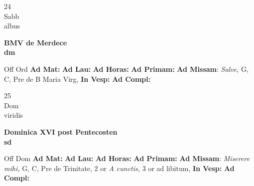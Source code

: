 \documentclass[10pt, openany]{book}
\begin{document}
    \begin{center}
        \begin{minipage}{3.5in}
            \vspace{2em}
            \begin{minipage}{0.5in}
                {\Huge 24} \\
                {\normalsize Sabb} \\
                {\normalsize albus}
            \end{minipage}
            \begin{minipage}{3.0in}
                \textbf{ \large BMV de Merdece \\
                \textnormal{\normalsize dm}} \\ 
            \end{minipage}
            \begin{justify}Off Ord
                \textbf{Ad Mat: }
                \textbf{Ad Lau: }
                \textbf{Ad Horas: }
                \textbf{Ad Primam: }\textbf{Ad Missam}: \textit{Salve,} G, C, Pre de B Maria Virg,  
                \textbf{In Vesp: }
                \textbf{Ad Compl: }
            \end{justify}
        \end{minipage}
    \end{center}

    \begin{center}
        \begin{minipage}{3.5in}
            \vspace{2em}
            \begin{minipage}{0.5in}
                {\Huge 25} \\
                {\normalsize Dom} \\
                {\normalsize viridis}
            \end{minipage}
            \begin{minipage}{3.0in}
                \textbf{ \large Dominica XVI post Pentecosten \\
                \textnormal{\normalsize sd}} \\ 
            \end{minipage}
            \begin{justify}Off Dom
                \textbf{Ad Mat: }
                \textbf{Ad Lau: }
                \textbf{Ad Horas: }
                \textbf{Ad Primam: }\textbf{Ad Missam}: \textit{Miserere mihi,} G, C, Pre de Trinitate, 2 or \textit{A cunctis,} 3 or ad libitum,  
                \textbf{In Vesp: }
                \textbf{Ad Compl: }
            \end{justify}
        \end{minipage}
    \end{center}
\end{document}
